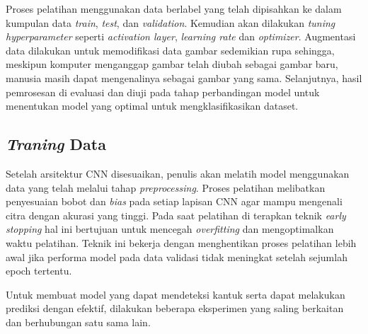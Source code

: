     


    Proses pelatihan menggunakan data berlabel yang telah dipisahkan ke dalam kumpulan data \textit{train}, \textit{test}, dan \textit{validation}. Kemudian akan dilakukan \textit{tuning hyperparameter} seperti \textit{activation layer}, \textit{learning rate} dan \textit{optimizer}. Augmentasi data dilakukan untuk memodifikasi data gambar sedemikian rupa sehingga, meskipun komputer menganggap gambar telah diubah sebagai gambar baru, manusia masih dapat mengenalinya sebagai gambar yang sama. Selanjutnya, hasil pemrosesan di evaluasi dan diuji pada tahap perbandingan model untuk menentukan model yang optimal untuk mengklasifikasikan dataset.

\subsection{\textit{Traning} Data}

    Setelah arsitektur CNN disesuaikan, penulis akan melatih model menggunakan data yang telah melalui tahap \textit{preprocessing}. Proses pelatihan melibatkan penyesuaian bobot dan \textit{bias} pada setiap lapisan CNN agar mampu mengenali citra dengan akurasi yang tinggi. Pada saat pelatihan di terapkan teknik \textit{early stopping} hal ini bertujuan untuk mencegah \textit{overfitting} dan mengoptimalkan waktu pelatihan. Teknik ini bekerja dengan menghentikan proses pelatihan lebih awal jika performa model pada data validasi tidak meningkat setelah sejumlah epoch tertentu.
    
    Untuk membuat model yang dapat mendeteksi kantuk serta dapat melakukan prediksi dengan efektif, dilakukan beberapa eksperimen yang saling berkaitan dan berhubungan satu sama lain.

